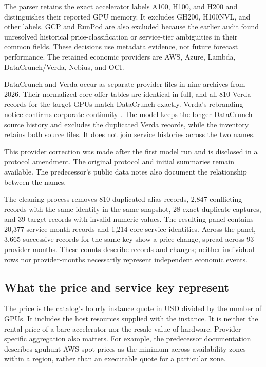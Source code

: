 \documentclass[10pt]{article}
\begin{document}
The parser retains the exact accelerator labels A100, H100, and H200 and distinguishes their reported GPU memory. It excludes GH200, H100NVL, and other labels. GCP and RunPod are also excluded because the earlier audit found unresolved historical price-classification or service-tier ambiguities in their common fields. These decisions use metadata evidence, not future forecast performance. The retained economic providers are AWS, Azure, Lambda, DataCrunch/Verda, Nebius, and OCI.

DataCrunch and Verda occur as separate provider files in nine archives from 2026. Their normalized core offer tables are identical in full, and all 810 Verda records for the target GPUs match DataCrunch exactly. Verda's rebranding notice confirms corporate continuity \citep{verda2025}. The model keeps the longer DataCrunch source history and excludes the duplicated Verda records, while the inventory retains both source files. It does not join service histories across the two names.

This provider correction was made after the first model run and is disclosed in a protocol amendment. The original protocol and initial summaries remain available. The predecessor's public data notes also document the relationship between the names.

The cleaning process removes 810 duplicated alias records, 2,847 conflicting records with the same identity in the same snapshot, 28 exact duplicate captures, and 39 target records with invalid numeric values. The resulting panel contains 20,377 service-month records and 1,214 core service identities. Across the panel, 3,665 successive records for the same key show a price change, spread across 93 provider-months. These counts describe records and changes; neither individual rows nor provider-months necessarily represent independent economic events.

\subsection{What the price and service key represent}

The price is the catalog's hourly instance quote in USD divided by the number of GPUs. It includes the host resources supplied with the instance. It is neither the rental price of a bare accelerator nor the resale value of hardware. Provider-specific aggregation also matters. For example, the predecessor documentation describes gpuhunt AWS spot prices as the minimum across availability zones within a region, rather than an executable quote for a particular zone.
\end{document}

